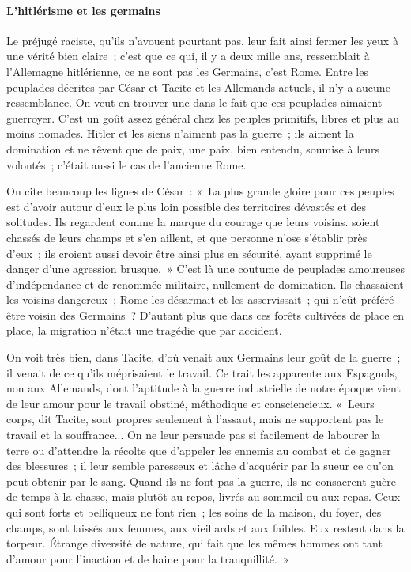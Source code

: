 \documentclass[french,twoside]{book} %
\begin{document}
\paragraph[L'hitlérisme et les germains]{L'hitlérisme et les germains}
\noindent Le préjugé raciste, qu'ils n'avouent pourtant pas, leur fait ainsi fermer les yeux à une vérité bien claire ; c'est que ce qui, il y a deux mille ans, ressem­blait à l'Allemagne hitlérienne, ce ne sont pas les Germains, c'est Rome. Entre les peuplades décrites par César et Tacite et les Allemands actuels, il n'y a aucune ressemblance. On veut en trouver une dans le fait que ces peuplades aimaient guerroyer. C'est un goût assez général chez les peuples primitifs, libres et plus au moins nomades. Hitler et les siens n'aiment pas la guerre ; ils aiment la domination et ne rêvent que de paix, une paix, bien entendu, soumise à leurs volontés ; c'était aussi le cas de l'ancienne Rome.\par
On cite beaucoup les lignes de César : « La plus grande gloire pour ces peuples est d'avoir autour d'eux le plus loin possible des territoires dévastés et des solitudes. Ils regardent comme la marque du courage que leurs voisins. soient chassés de leurs champs et s'en aillent, et que personne n'ose s'établir près d'eux ; ils croient aussi devoir être ainsi plus en sécurité, ayant supprimé le danger d'une agression brusque. » C'est là une coutume de peuplades amou­reuses d'indépendance et de renommée militaire, nullement de domination. Ils chassaient les voisins dangereux ; Rome les désarmait et les asservissait ; qui n'eût préféré être voisin des Germains ? D'autant plus que dans ces forêts cultivées de place en place, la migration n'était une tragédie que par accident.\par
On voit très bien, dans Tacite, d'où venait aux Germains leur goût de la guerre ; il venait de ce qu'ils méprisaient le travail. Ce trait les apparente aux Espagnols, non aux Allemands, dont l'aptitude à la guerre industrielle de notre époque vient de leur amour pour le travail obstiné, méthodique et conscien­cieux. « Leurs corps, dit Tacite, sont propres seulement à l'assaut, mais ne supportent pas le travail et la souffrance... On ne leur persuade pas si facile­ment de labourer la terre ou d'attendre la récolte que d'appeler les ennemis au combat et de gagner des blessures ; il leur semble paresseux et lâche d'acquérir par la sueur ce qu'on peut obtenir par le sang. Quand ils ne font pas la guerre, ils ne consacrent guère de temps à la chasse, mais plutôt au repos, livrés au sommeil ou aux repas. Ceux qui sont forts et belliqueux ne font rien ; les soins de la maison, du foyer, des champs, sont laissés aux femmes, aux vieillards et aux faibles. Eux restent dans la torpeur. Étrange diversité de nature, qui fait que les mêmes hommes ont tant d'amour pour l'inaction et de haine pour la tranquillité. »\par
\end{document}
